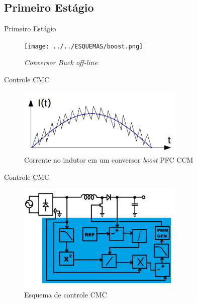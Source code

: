 \documentclass{beamer}
\begin{document}
\subsection{Primeiro Estágio}
\begin{frame}{Primeiro Estágio}
	
	\begin{figure}[htb]
		\centering
		\texttt{[image: ../../ESQUEMAS/boost.png]}
		\caption{\textit{Conversor \textit{Buck} off-line}}
	\end{figure}
	
\end{frame}
\begin{frame}{Controle CMC}
	
	\begin{figure}[htb]
		\centering
		\includegraphics[width=8cm]{../../RABISCOS/cmc_wav}
		\caption{Corrente no indutor em um conversor \textit{boost} PFC CCM}
	\end{figure}
	
\end{frame}
\begin{frame}{Controle CMC}
	
	\begin{figure}[htb]
		\centering
		\includegraphics[width=8cm]{../../ESQUEMAS/PFC_CTRL.png}
		\caption{Esquema de controle CMC}
	\end{figure}
	
\end{frame}
\end{document}
